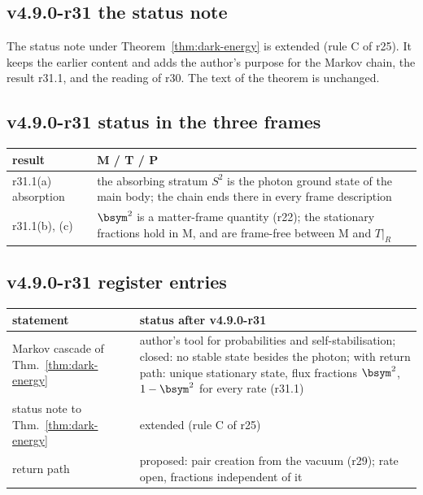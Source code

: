 \subsection*{v4.9.0-r31 the status note}
\label{subsec:v490-r31-note}

The status note under Theorem~\ref{thm:dark-energy} is extended (rule C of r25).  It keeps the earlier content and adds the author's
purpose for the Markov chain, the result r31.1, and the reading of r30.  The text of the theorem is unchanged.

\subsection*{v4.9.0-r31 status in the three frames}
\label{subsec:v490-r31-frames}

\begin{center}
\small
\begin{tabular}{@{}>{\raggedright\arraybackslash}p{}>{\raggedright\arraybackslash}p{}@{}}
\toprule
result & M / T / P\\
\midrule
r31.1(a) absorption & the absorbing stratum \(S^2\) is the photon ground state of the main body; the chain ends there in every frame description\\
r31.1(b), (c) & \(\bsym^2\) is a matter-frame quantity (r22); the stationary fractions hold in M, and are frame-free between M and \(T|_R\)\\
\bottomrule
\end{tabular}
\end{center}

\subsection*{v4.9.0-r31 register entries}
\label{subsec:v490-r31-register}

\begin{center}
\small
\begin{tabular}{@{}>{\raggedright\arraybackslash}p{}>{\raggedright\arraybackslash}p{}@{}}
\toprule
statement & status after v4.9.0-r31\\
\midrule
Markov cascade of Thm.~\ref{thm:dark-energy} & author's tool for probabilities and self-stabilisation; closed: no stable state besides the photon; with return path: unique stationary state, flux fractions \(\bsym^2\), \(1-\bsym^2\) for every rate (r31.1)\\
status note to Thm.~\ref{thm:dark-energy} & extended (rule C of r25)\\
return path & proposed: pair creation from the vacuum (r29); rate open, fractions independent of it\\
\bottomrule
\end{tabular}
\end{center}

